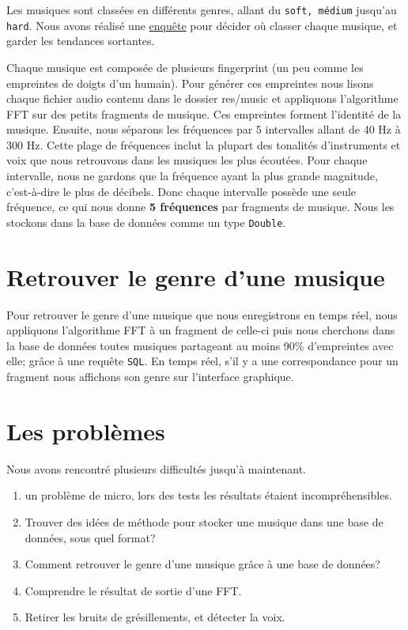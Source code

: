 \documentclass{article}
\begin{document}
Les musiques sont classées en différents genres, allant du {\tt soft, médium} jusqu’au {\tt hard}.
Nous avons réalisé une \href{https://forms.gle/NTLry1uyFKKYFDkL7}{enquête} pour décider où classer chaque musique,
et garder les tendances sortantes.

Chaque musique est composée de plusieurs fingerprint (un peu comme les empreintes de doigts d’un humain).
Pour générer ces empreintes nous lisons chaque fichier audio contenu dans le dossier res/music et
appliquons l'algorithme FFT sur des petits fragments de musique.
Ces empreintes forment l’identité de la musique. Ensuite, nous séparons les fréquences par
5 intervalles allant de 40 Hz à 300 Hz. Cette plage de fréquences inclut la plupart
des tonalités d’instruments et voix que nous retrouvons dans les musiques les plus écoutées.
Pour chaque intervalle, nous ne gardons que la fréquence ayant la plus grande magnitude,
c'est-à-dire le plus de décibels. Donc chaque intervalle possède une seule fréquence,
ce qui nous donne {\bf 5 fréquences} par fragments de musique.
Nous les stockons dans la base de données comme un type {\tt Double}.

\section{Retrouver le genre d’une musique }
\label{marker}
Pour retrouver le genre d’une musique que nous enregistrons en temps réel,
nous appliquons l’algorithme FFT à un fragment de celle-ci puis nous cherchons dans
la base de données toutes musiques partageant au moins 90\% d’empreintes
avec elle; grâce à une requête {\tt SQL}.
En temps réel, s’il y a une correspondance pour un fragment nous affichons
son genre sur l’interface graphique.

\section{Les problèmes }

Nous avons rencontré plusieurs difficultés jusqu'à maintenant.
\begin{enumerate}
  \item un problème de micro, lors des tests les résultats étaient incompréhensibles.
  \item Trouver des idées de méthode pour stocker une musique dans une base de données, sous quel format?
  \item Comment retrouver le genre d’une musique grâce à une base de données?
  \item Comprendre le résultat de sortie d’une FFT.
  \item Retirer les bruits de grésillements, et détecter la voix.
\end{enumerate}
\end{document}
